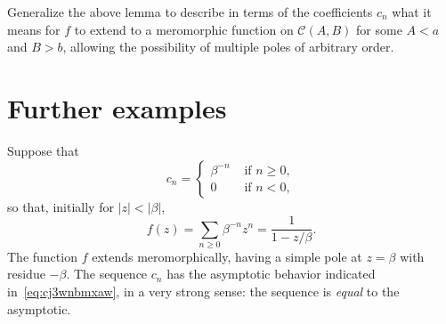 \documentclass[reqno]{amsart} 
\begin{document}
\begin{exercise}
  Generalize the above lemma to describe in terms of the coefficients $c_n$ what it means for $f$ to extend to a meromorphic function on $\mathcal{C}(A,B)$ for some $A < a$ and $B > b$, allowing the possibility of multiple poles of arbitrary order.
\end{exercise}

\section{Further examples}\label{sec:cj4unj3scf}


\begin{example}
  Suppose that
  \begin{equation*}
    c_n =
    \begin{cases}
      \beta^{- n} & \text{ if } n \geq 0, \\
      0 & \text{ if } n < 0,
    \end{cases}
  \end{equation*}
  so that, initially for $\lvert z \rvert < |\beta|$,
  \begin{equation*}
    f (z) = \sum_{n \geq 0} \beta^{-n} z^n = \frac{1}{1 - z / \beta }.
  \end{equation*}
  The function $f$ extends meromorphically, having a simple pole at $z = \beta$ with residue $-\beta$.  The sequence $c_n$ has the asymptotic behavior indicated in~\eqref{eq:cj3wnbmxaw}, in a very strong sense: the sequence is \emph{equal} to the asymptotic.
\end{example}
\end{document}
